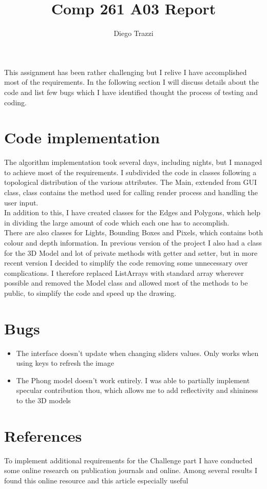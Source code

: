 \documentclass[11pt, oneside]{article} %
\title{Comp 261 A03 Report}
\author{Diego Trazzi}
\begin{document}
\maketitle
This assignment has been rather challenging but I relive I have accomplished most of the requirements. In the following section I will discuss details about the code and list few bugs which I have identified thought the process of testing and coding.
\section{Code implementation}
The algorithm implementation took several days, including nights, but I managed to achieve most of the requirements. I subdivided the code in classes following a topological distribution of the various attributes. The Main, extended from GUI class,  class contains the method used for calling render process and handling the user input.\\ In addition to this, I have created classes for the Edges and Polygons, which help in dividing the large amount of code which each one has to accomplish.\\ There are also classes for Lights, Bounding Boxes and Pixels, which contains both colour and depth information. In previous version of the project I also had a class for the 3D Model and lot of private methods with getter and setter, but in more recent version I decided to simplify the code removing some unnecessary over complications. I therefore replaced ListArrays with standard array wherever possible and removed the Model class and allowed most of the methods to be public, to simplify the code and speed up the drawing.
\section{Bugs}
\begin{itemize}
\item The interface doesn't update when changing sliders values. Only works when using keys to refresh the 
image
\item The Phong model doesn't work entirely. I was able to partially implement specular contribution thou, which allows me to add reflectivity and shininess to the 3D models
\end{itemize}
\section{References}
To implement additional requirements for the Challenge part I have conducted some online research on publication journals and online. Among several results I found this online resource \cite{PhongShading} and this article \cite{Phong:1975aa} especially useful


\end{document}
